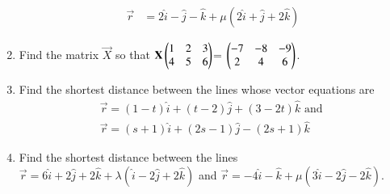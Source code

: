 \begin{enumerate}[label=\thesubsection.\arabic*,ref=\thesubsection.\theenumi]
\begin{align}
	\\
	\overrightarrow{r}&=2\hat{i}-\hat{j}-\hat{k}+\mu(2\hat{i}+\hat{j}+2\hat{k})
\end{align}
\item Find the matrix $\vec{X}$ so that $\mathbf{X}\begin{pmatrix}1&2&3\\ 4&5&6\end{pmatrix}$= $\begin{pmatrix}-7&-8&-9\\ 2&4&6\end{pmatrix}$.
\item Find the shortest distance between the lines whose vector equations are 
\begin{align} 
\overrightarrow{r}=(1-t)\hat{i}+(t-2)\hat{j}+(3-2t)\hat{k} \text{ and }\\ \overrightarrow{r}=(s+1)\hat{i}+(2s-1)\hat{j}-(2s+1)\hat{k}
\end{align}
\item Find the shortest distance between the lines $\overrightarrow{r}=6\hat{i}+2\hat{j}+2\hat{k}+\lambda(\hat{i}-2\hat{j}+2\hat{k})$ and $\overrightarrow{r}=-4\hat{i}-\hat{k}+\mu(3\hat{i}-2\hat{j}-2\hat{k})$.
\end{enumerate}
